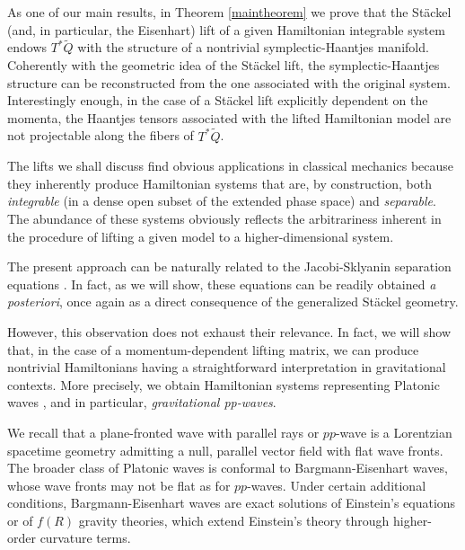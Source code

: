 \documentclass[10pt]{amsart}
\numberwithin{equation}{section}
\theoremstyle{definition}
\begin{document}
	
	As one of our main results, in Theorem \ref{maintheorem} we prove that the St\"ackel (and, in particular, the Eisenhart) lift of a given Hamiltonian integrable system endows $T^{*}\tilde{Q}$ with the structure of a nontrivial symplectic-Haantjes manifold. Coherently with the geometric idea of the St\"ackel lift, the symplectic-Haantjes structure can be reconstructed from the one associated with the original system. Interestingly enough, in the case of a St\"ackel lift explicitly dependent on the momenta, the Haantjes tensors associated with the lifted Hamiltonian model are not projectable along the fibers of $T^{*}\tilde{Q}$.
	

	
The lifts we  shall discuss find obvious applications in classical mechanics because they inherently produce Hamiltonian systems that are, by construction, both \textit{integrable} (in a dense open subset of the extended phase space) and \textit{separable}.
The abundance of these systems obviously reflects the arbitrariness inherent in the procedure of lifting a given model to a higher-dimensional system.

The present approach can be naturally related to the Jacobi-Sklyanin separation equations \cite{Skl}. In fact, as we will show, these equations can be readily obtained \textit{a posteriori}, once again as a direct consequence of the generalized Stäckel geometry.
	
	
	However, this observation does not exhaust their relevance. In fact, we will show that, in the case of a momentum-dependent lifting matrix, we can produce nontrivial Hamiltonians having a straightforward interpretation in gravitational contexts. More precisely, we obtain Hamiltonian systems representing Platonic waves \cite{BM2013PRD}, and in particular, \textit{gravitational pp-waves}.
	
	We recall that a plane-fronted wave with parallel rays or $pp$-wave is a Lorentzian spacetime geometry admitting a null, parallel vector field with flat wave fronts. The broader class of Platonic waves is conformal to Bargmann-Eisenhart waves, whose  wave fronts may not be flat as for $pp$-waves. Under certain additional conditions, Bargmann-Eisenhart waves are exact solutions of Einstein's equations or of $f(R)$ gravity theories, which extend Einstein's theory through higher-order curvature terms.
	
\end{document}
